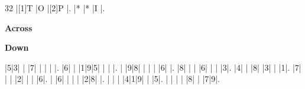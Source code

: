 \documentclass{article}
\begin{document}
\begin{Puzzle}{3}{2}
|[1]T |O |[2]P |.
|*    |* |I    |.
\end{Puzzle}
\begin{PuzzleClues}{\textbf{Across}}
\end{PuzzleClues}
\begin{PuzzleClues}{\textbf{Down}}
\end{PuzzleClues}

\begin{sudoku}
|5|3| | |7| | | | |.
|6| | |1|9|5| | | |.
| |9|8| | | | |6| |.
|8| | | |6| | | |3|.
|4| | |8| |3| | |1|.
|7| | | |2| | | |6|.
| |6| | | | |2|8| |.
| | | |4|1|9| | |5|.
| | | | |8| | |7|9|.
\end{sudoku}

\end{document}
